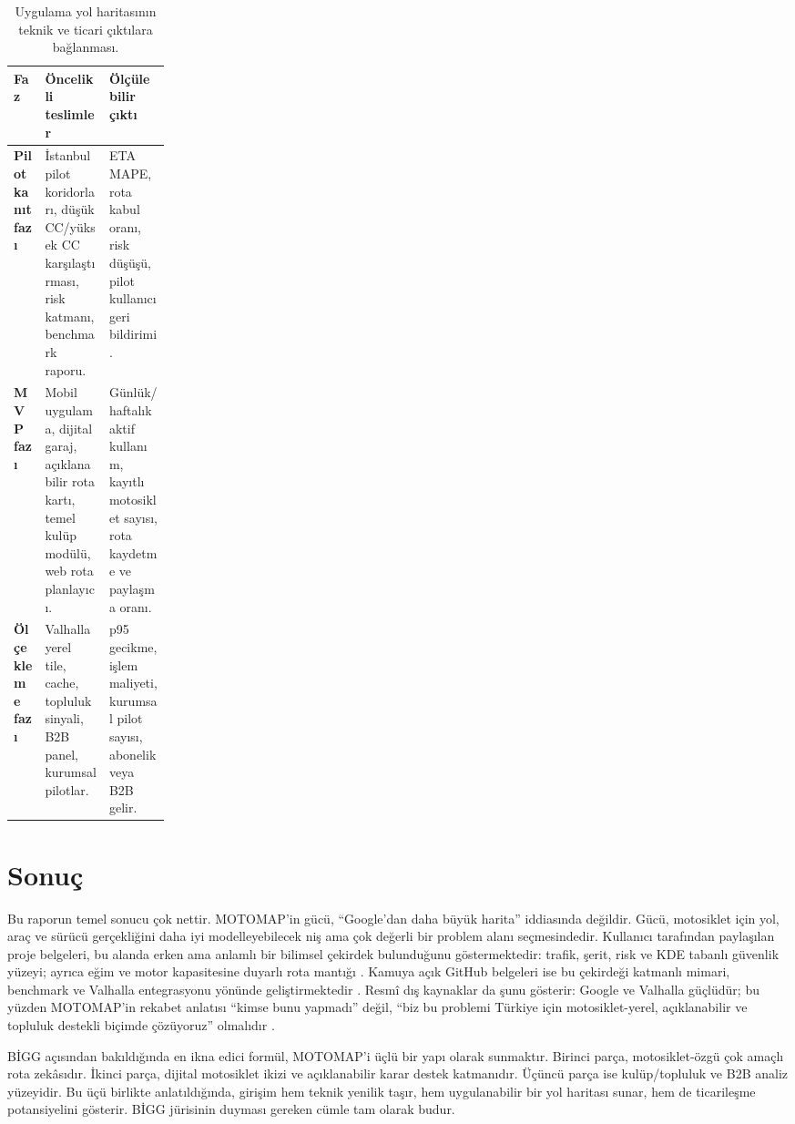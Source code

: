 \documentclass[11pt,a4paper]{article}
\begin{document}
\begin{table}[htbp]
\centering
\small
{}
\begin{tabularx}{\linewidth}{>{\bfseries}p{0.2\linewidth}Y Y}
\toprule
Faz & Öncelikli teslimler & Ölçülebilir çıktı \\
\midrule
Pilot kanıt fazı & İstanbul pilot koridorları, düşük CC/yüksek CC karşılaştırması, risk katmanı, benchmark raporu. & ETA MAPE, rota kabul oranı, risk düşüşü, pilot kullanıcı geri bildirimi. \\
MVP fazı & Mobil uygulama, dijital garaj, açıklanabilir rota kartı, temel kulüp modülü, web rota planlayıcı. & Günlük/haftalık aktif kullanım, kayıtlı motosiklet sayısı, rota kaydetme ve paylaşma oranı. \\
Ölçekleme fazı & Valhalla yerel tile, cache, topluluk sinyali, B2B panel, kurumsal pilotlar. & p95 gecikme, işlem maliyeti, kurumsal pilot sayısı, abonelik veya B2B gelir. \\
\bottomrule
\end{tabularx}
\caption{Uygulama yol haritasının teknik ve ticari çıktılara bağlanması.}
\end{table}

\section{Sonuç}

Bu raporun temel sonucu çok nettir. MOTOMAP'in gücü, ``Google'dan daha büyük harita'' iddiasında değildir. Gücü, motosiklet için yol, araç ve sürücü gerçekliğini daha iyi modelleyebilecek niş ama çok değerli bir problem alanı seçmesindedir. Kullanıcı tarafından paylaşılan proje belgeleri, bu alanda erken ama anlamlı bir bilimsel çekirdek bulunduğunu göstermektedir: trafik, şerit, risk ve KDE tabanlı güvenlik yüzeyi; ayrıca eğim ve motor kapasitesine duyarlı rota mantığı \cite{u1,u2}. Kamuya açık GitHub belgeleri ise bu çekirdeği katmanlı mimari, benchmark ve Valhalla entegrasyonu yönünde geliştirmektedir \cite{g1,g2,g3,g6}. Resmî dış kaynaklar da şunu gösterir: Google ve Valhalla güçlüdür; bu yüzden MOTOMAP'in rekabet anlatısı ``kimse bunu yapmadı'' değil, ``biz bu problemi Türkiye için motosiklet-yerel, açıklanabilir ve topluluk destekli biçimde çözüyoruz'' olmalıdır \cite{o1,o7,o14,o15,o16,o17}.

BİGG açısından bakıldığında en ikna edici formül, MOTOMAP'i üçlü bir yapı olarak sunmaktır. Birinci parça, motosiklet-özgü çok amaçlı rota zekâsıdır. İkinci parça, dijital motosiklet ikizi ve açıklanabilir karar destek katmanıdır. Üçüncü parça ise kulüp/topluluk ve B2B analiz yüzeyidir. Bu üçü birlikte anlatıldığında, girişim hem teknik yenilik taşır, hem uygulanabilir bir yol haritası sunar, hem de ticarileşme potansiyelini gösterir. BİGG jürisinin duyması gereken cümle tam olarak budur.
\end{document}

